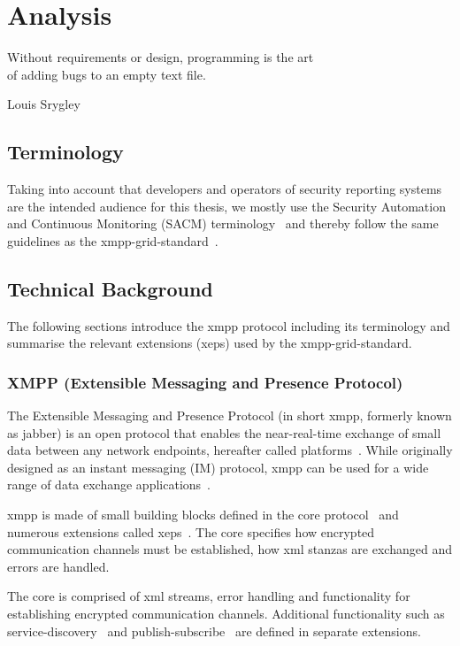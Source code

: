 \chapter{Analysis}
\epigraph{Without requirements or design, programming is the art\\of adding bugs to an empty text file.}{Louis Srygley}
\section{Terminology}
Taking into account that developers and operators of security reporting systems are the intended audience for this thesis,
we mostly use the  Security Automation and Continuous Monitoring (SACM) terminology~\cite{ietf-sacm-terminology-14}
and thereby follow the same guidelines as the \gls{xmpp-grid-standard}~\cite{ietf-mile-xmpp-grid-05}.

\section{Technical Background}\label{sec:technical-background}

The following sections introduce the \gls{xmpp} protocol including its terminology and summarise the relevant extensions (\glspl{xep}) used by the \gls{xmpp-grid-standard}.

\subsection{XMPP (Extensible Messaging and Presence Protocol)}
The Extensible Messaging and Presence Protocol (in short \gls{xmpp}, formerly known as \gls{jabber}) is an open protocol that enables the near-real-time exchange of small data between any network endpoints, hereafter called \glspl{platform}~\cite{rfc6120}.
While originally designed as an instant messaging (IM) protocol, \gls{xmpp} can be used for a wide range of data exchange applications~\cite{ieee-xplore-stream-xml-xmpp}.

\gls{xmpp} is made of small building blocks defined in the core protocol~\cite{rfc6120} and numerous extensions called \glspl{xep}~\cite{xep-0001}.
The core specifies how encrypted communication channels must be established, how \gls{xml} \glspl{stanza} are exchanged and errors are handled.

The core is comprised of \gls{xml} streams, error handling and functionality for establishing encrypted communication channels.
Additional functionality such as \gls{service-discovery}~\cite{xep-0030} and \gls{publish-subscribe}~\cite{xep-0060} are defined in separate extensions.

